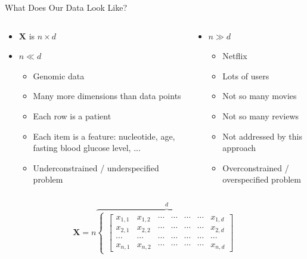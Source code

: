 \documentclass[aspectratio=169]{beamer}
\begin{document}
\begin{frame}{What Does Our Data Look Like?}

\begin{columns}
\begin{column}{0.5\textwidth}
\begin{itemize}
\item $\textbf{X}$ is $n \times d$
\item $n \ll  d$
\begin{itemize}
\item Genomic data
\item Many more dimensions than data points
\item Each row is a patient
\item Each item is a feature: nucleotide, age, fasting blood glucose level, ...
\item Underconstrained / underspecified problem
\end{itemize}
\end{itemize}
\end{column}
\begin{column}{0.5\textwidth}
\begin{itemize}
\item $n \gg d$
\begin{itemize}
\item Netflix
\item Lots of users
\item Not so many movies
\item Not so many reviews
\item Not addressed by this approach
\item Overconstrained / overspecified problem 
\end{itemize}
\end{itemize}
\end{column}
\end{columns}
\[
\textbf{X}= n \overbrace{\begin{cases}
               \left[\begin{array}{ccccccc}
	x_{1,1} & x_{1,2} & \cdots& \cdots& \cdots& \cdots & x_{1,d}	\\
	x_{2,1} & x_{2,2} & \cdots & \cdots& \cdots& \cdots& x_{2,d}	\\
	\cdots & \cdots & \cdots & \cdots& \cdots& \cdots&\cdots	\\
	x_{n,1} & x_{n,2} & \cdots& \cdots& \cdots& \cdots & x_{n,d}	
\end{array}\right]
            \end{cases}}^d
\]
\end{frame}
\end{document}
